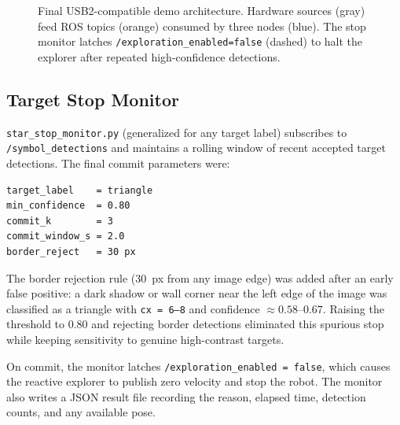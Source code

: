\documentclass[letterpaper, 10 pt, conference]{ieeeconf/ieeeconf}
\begin{document}
\begin{figure}[t]
{}%
  \caption{Final USB2-compatible demo architecture. Hardware sources (gray)
           feed ROS topics (orange) consumed by three nodes (blue).
           The stop monitor latches \texttt{/exploration\_enabled=false}
           (dashed) to halt the explorer after repeated high-confidence
           detections.}
  \label{fig:arch}
\end{figure}

\subsection{Target Stop Monitor}

\texttt{star\_stop\_monitor.py} (generalized for any target label) subscribes
to \texttt{/symbol\_detections} and maintains a rolling window of recent
accepted target detections.
The final commit parameters were:
\begin{verbatim}
target_label    = triangle
min_confidence  = 0.80
commit_k        = 3
commit_window_s = 2.0
border_reject   = 30 px
\end{verbatim}

The border rejection rule (30~px from any image edge) was added after an
early false positive: a dark shadow or wall corner near the left edge of
the image was classified as a triangle with \texttt{cx = 6--8} and
confidence $\approx 0.58$--$0.67$.
Raising the threshold to 0.80 and rejecting border detections eliminated
this spurious stop while keeping sensitivity to genuine high-contrast targets.

On commit, the monitor latches \texttt{/exploration\_enabled = false},
which causes the reactive explorer to publish zero velocity and stop the robot.
The monitor also writes a JSON result file recording the reason, elapsed time,
detection counts, and any available pose.
\end{document}
